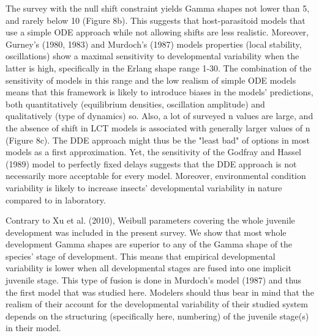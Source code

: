 \documentclass[12pt,a4paper,onecolumn]{article}
\begin{document}
\tabto{1 cm} The survey with the null shift constraint yields Gamma shapes not lower than 5, and rarely below 10 (Figure 8b). This suggests that host-parasitoid models that use a simple ODE approach while not allowing shifts are less realistic. Moreover, Gurney's (1980, 1983) and Murdoch's (1987) models properties (local stability, oscillations) show a maximal sensitivity to developmental variability when the latter is high, specifically in the Erlang shape range 1-30. The combination of the sensitivity of models in this range and the low realism of simple ODE models means that this framework is likely to introduce biases in the models' predictions, both quantitatively (equilibrium densities, oscillation amplitude) and qualitatively (type of dynamics) so. Also, a lot of surveyed n values are large, and the absence of shift in LCT models is associated with generally larger values of n (Figure 8c). The DDE approach might thus be the "least bad" of options in most models as a first approximation. Yet, the sensitivity of the Godfray and Hassel (1989) model to perfectly fixed delays suggests that the DDE approach is not necessarily more acceptable for every model. Moreover, environmental condition variability is likely to increase insects' developmental variability in nature compared to in laboratory.

\tabto{1 cm} Contrary to Xu et al. (2010), Weibull parameters covering the whole juvenile development was included in the present survey. We show that most whole development Gamma shapes are superior to any of the Gamma shape of the species' stage of development. This means that empirical developmental variability is lower when all developmental stages are fused into one implicit juvenile stage. This type of fusion is done in Murdoch's model (1987) and thus the first model that was studied here. Modelers should thus bear in mind that the realism of their account for the developmental variability of their studied system depends on the structuring (specifically here, numbering) of the juvenile stage(s) in their model.
\end{document}
